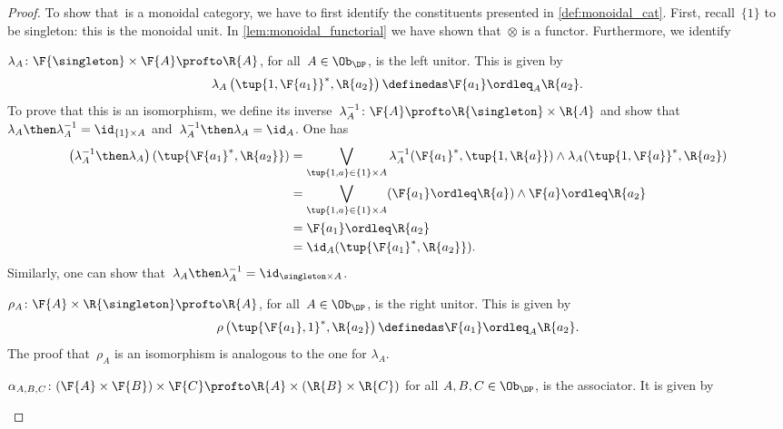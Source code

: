 \begin{proof}
  To show that~\DP is a monoidal category, we have to first identify the constituents presented in \cref{def:monoidal_cat}. First, recall~$\{1\}$ to be singleton: this is the monoidal unit. In \cref{lem:monoidal_functorial} we have shown that~$\otimes$ is a functor. Furthermore, we identify
  \begin{compactitem}
    \item $\lambda_A \colon \F{\singleton} \times \F{A} \profto \R{A}$, for all~$A\in \Ob_\DP$, is the left unitor. This is given by
    \begin{equation}
      \lambda_A\left( \tup{1,\F{a_1}}^*,\R{a_2}\right)\definedas \F{a_1}\ordleq_A \R{a_2}.
    \end{equation}
    To prove that this is an isomorphism, we define its inverse~$\lambda_A^{-1}\colon \F{A}\profto \R{\singleton} \times \R{A}$ and show that~$\lambda_A\then \lambda_A^{-1}=\id_{\{1\}\times A}$ and~$\lambda_A^{-1}\then \lambda_A=\id_{A}$. One has
    \begin{equation}
      \begin{aligned}
        \left( \lambda_A^{-1}\then \lambda_A\right)(\tup{\F{a_1}^*,\R{a_2}})&= \bigvee_{\tup{1,a}\in  \{1\}\times A} \lambda_A^{-1}(\F{a_1}^*,\tup{1,\R{a}})\wedge \lambda_A(\tup{1,\F{a}}^*,\R{a_2})\\
        &= \bigvee_{\tup{1,a}\in  \{1\}\times A}(\F{a_1}\ordleq \R{a}) \wedge \F{a}\ordleq \R{a_2}\\
        &=\F{a_1}\ordleq \R{a_2}\\
        &=\id_A(\tup{\F{a_1}^*,\R{a_2}}).
      \end{aligned}
    \end{equation}
    Similarly, one can show that~$\lambda_A\then \lambda_A^{-1}=\id_{\singleton \times A}$.
    \item $\rho_A\colon \F{A} \times \R{\singleton} \profto \R{A}$, for all~$A\in \Ob_\DP$, is the right unitor. This is given by
    \begin{equation}
      \rho\left( \tup{\F{a_1},1}^*,\R{a_2}\right)\definedas \F{a_1}\ordleq_A \R{a_2}.
    \end{equation}
    The proof that~$\rho_A$ is an isomorphism is analogous to the one for $\lambda_A$.
    \item $\alpha_{A,B,C}\colon (\F{A}\times \F{B})\times \F{C} \profto \R{A} \times (\R{B}\times \R{C})$ for all $A,B,C \in \Ob_\DP$, is the associator. It is given by
    \begin{equation}

\end{equation}
\end{compactitem}
\end{proof}
